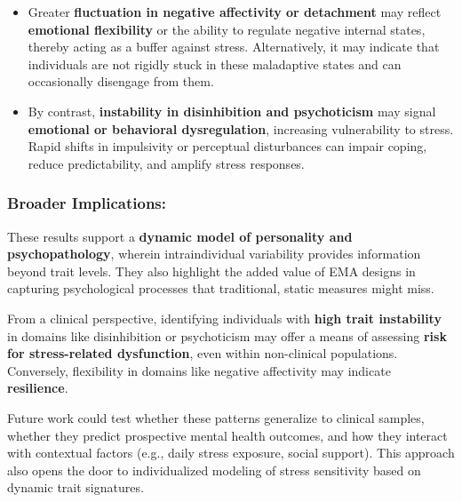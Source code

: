 \documentclass[
  11pt,
  a4paper,
  onecolumn]{article}
\begin{document}
\begin{itemize}
\item
  Greater \textbf{fluctuation in negative affectivity or detachment} may
  reflect \textbf{emotional flexibility} or the ability to regulate
  negative internal states, thereby acting as a buffer against stress.
  Alternatively, it may indicate that individuals are not rigidly stuck
  in these maladaptive states and can occasionally disengage from them.
\item
  By contrast, \textbf{instability in disinhibition and psychoticism}
  may signal \textbf{emotional or behavioral dysregulation}, increasing
  vulnerability to stress. Rapid shifts in impulsivity or perceptual
  disturbances can impair coping, reduce predictability, and amplify
  stress responses.
\end{itemize}

\subsubsection{Broader Implications:}\label{broader-implications}

These results support a \textbf{dynamic model of personality and
psychopathology}, wherein intraindividual variability provides
information beyond trait levels. They also highlight the added value of
EMA designs in capturing psychological processes that traditional,
static measures might miss.

From a clinical perspective, identifying individuals with \textbf{high
trait instability} in domains like disinhibition or psychoticism may
offer a means of assessing \textbf{risk for stress-related dysfunction},
even within non-clinical populations. Conversely, flexibility in domains
like negative affectivity may indicate \textbf{resilience}.

Future work could test whether these patterns generalize to clinical
samples, whether they predict prospective mental health outcomes, and
how they interact with contextual factors (e.g., daily stress exposure,
social support). This approach also opens the door to individualized
modeling of stress sensitivity based on dynamic trait signatures.
\end{document}
